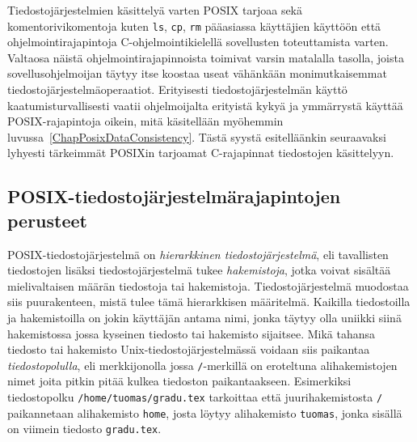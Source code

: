 Tiedostojärjestelmien käsittelyä varten POSIX tarjoaa sekä komentorivikomentoja kuten \texttt{ls}, \texttt{cp}, \texttt{rm} pääasiassa käyttäjien käyttöön että ohjelmointirajapintoja C-ohjelmointikielellä sovellusten toteuttamista varten.
Valtaosa näistä ohjelmointirajapinnoista toimivat varsin matalalla tasolla,
joista sovellusohjelmoijan täytyy itse koostaa useat vähänkään monimutkaisemmat tiedostojärjestelmäoperaatiot.
Erityisesti tiedostojärjestelmän käyttö kaatumisturvallisesti vaatii ohjelmoijalta erityistä kykyä ja ymmärrystä käyttää POSIX-rajapintoja oikein,
mitä käsitellään myöhemmin luvussa~\ref{ChapPosixDataConsistency}.
Tästä syystä esitelläänkin seuraavaksi lyhyesti tärkeimmät POSIXin tarjoamat C-rajapinnat tiedostojen käsittelyyn.

\subsection{POSIX-tiedostojärjestelmärajapintojen perusteet}
POSIX-tiedostojärjestelmä on \emph{hierarkkinen tiedostojärjestelmä},
eli tavallisten tiedostojen lisäksi tiedostojärjestelmä tukee \emph{hakemistoja},
jotka voivat sisältää mielivaltaisen määrän tiedostoja tai hakemistoja.
Tiedostojärjestelmä muodostaa siis puurakenteen, mistä tulee tämä hierarkkisen määritelmä.
Kaikilla tiedostoilla ja hakemistoilla on jokin käyttäjän antama nimi,
jonka täytyy olla uniikki siinä hakemistossa jossa kyseinen tiedosto tai hakemisto sijaitsee.
Mikä tahansa tiedosto tai hakemisto Unix-tiedostojärjestelmässä voidaan siis paikantaa \emph{tiedostopolulla},
eli merkkijonolla jossa \texttt{/}-merkillä on eroteltuna alihakemistojen nimet joita pitkin pitää kulkea tiedoston paikantaakseen.
Esimerkiksi tiedostopolku \texttt{/home/tuomas/gradu.tex}
tarkoittaa että juurihakemistosta \texttt{/} paikannetaan alihakemisto \texttt{home}, josta löytyy alihakemisto \texttt{tuomas}, jonka sisällä on viimein tiedosto \texttt{gradu.tex}.


